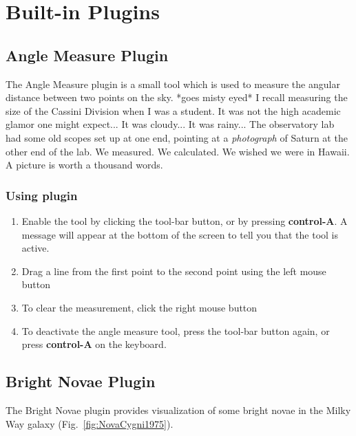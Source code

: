 
\chapter{Built-in Plugins}
\label{ch:BuiltinPlugins}

\section{Angle Measure Plugin}
\label{sec:plugins:AngleMeasure}


The Angle Measure plugin is a small tool which is used to measure the
angular distance between two points on the sky. *goes misty eyed* I
recall measuring the size of the Cassini Division when I was a student.
It was not the high academic glamor one might expect... It was cloudy...
It was rainy... The observatory lab had some old scopes set up at one
end, pointing at a \emph{photograph} of Saturn at the other end of the
lab. We measured. We calculated. We wished we were in Hawaii. A picture
is worth a thousand words.

\subsection{Using plugin}
\label{sec:plugins:AngleMeasure:using}

\begin{enumerate}
\item
  Enable the tool by clicking the tool-bar button, or by pressing
  \textbf{control-A}. A message will appear at the bottom of the screen
  to tell you that the tool is active.
\item
  Drag a line from the first point to the second point using the left
  mouse button
\item
  To clear the measurement, click the right mouse button
\item
  To deactivate the angle measure tool, press the tool-bar button again,
  or press \textbf{control-A} on the keyboard.
\end{enumerate}

\section{Bright Novae Plugin}
\label{sec:plugins:BrightNovae}

The Bright Novae plugin provides visualization of some bright novae in
the Milky Way galaxy (Fig.~\ref{fig:NovaCygni1975}).

